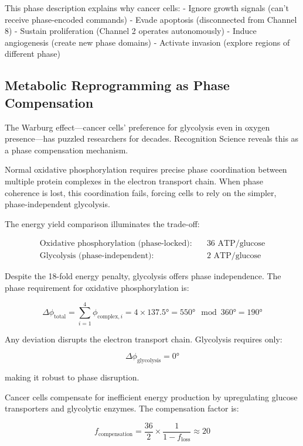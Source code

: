 \documentclass[12pt,a4paper]{report}
\begin{document}
This phase description explains why cancer cells:
- Ignore growth signals (can't receive phase-encoded commands)
- Evade apoptosis (disconnected from Channel 8)
- Sustain proliferation (Channel 2 operates autonomously)
- Induce angiogenesis (create new phase domains)
- Activate invasion (explore regions of different phase)

\subsection{Metabolic Reprogramming as Phase Compensation}

The Warburg effect—cancer cells' preference for glycolysis even in oxygen presence—has puzzled researchers for decades. Recognition Science reveals this as a phase compensation mechanism.

Normal oxidative phosphorylation requires precise phase coordination between multiple protein complexes in the electron transport chain. When phase coherence is lost, this coordination fails, forcing cells to rely on the simpler, phase-independent glycolysis.

The energy yield comparison illuminates the trade-off:

\begin{align}
\text{Oxidative phosphorylation (phase-locked)}: &\quad 36 \text{ ATP/glucose} \\
\text{Glycolysis (phase-independent)}: &\quad 2 \text{ ATP/glucose}
\end{align}

Despite the 18-fold energy penalty, glycolysis offers phase independence. The phase requirement for oxidative phosphorylation is:

\begin{equation}
\Delta\phi_{\text{total}} = \sum_{i=1}^{4} \phi_{\text{complex},i} = 4 \times 137.5° = 550° \mod 360° = 190°
\end{equation}

Any deviation disrupts the electron transport chain. Glycolysis requires only:

\begin{equation}
\Delta\phi_{\text{glycolysis}} = 0°
\end{equation}

making it robust to phase disruption.

Cancer cells compensate for inefficient energy production by upregulating glucose transporters and glycolytic enzymes. The compensation factor is:

\begin{equation}
f_{\text{compensation}} = \frac{36}{2} \times \frac{1}{1 - f_{\text{loss}}} \approx 20
\end{equation}
\end{document}
